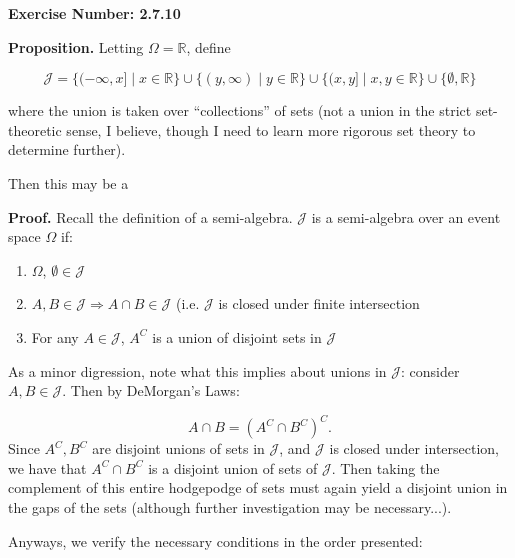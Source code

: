 \documentclass{article}
\begin{document}
\noindent \textbf{Exercise Number: 2.7.10}  %

\medskip 

\noindent \textbf{Proposition.} Letting $\Omega = \mathbb{R}$, define

\[\mathcal{J} = \Big\{(-\infty, x] \mid x \in \mathbb{R} \Big\} \cup \Big\{(y, \infty) \mid y \in \mathbb{R} \Big\} \cup \Big\{ (x,y] \mid x,y \in \mathbb{R} \Big\} \cup \Big\{\emptyset, \mathbb{R} \Big\}\]

where the union is taken over ``collections'' of sets (not a union in the strict set-theoretic
sense, I believe, though I need to learn more rigorous set theory to determine further). 

Then this may be a 

\bigskip

\noindent \textbf{Proof.} Recall the definition of a semi-algebra. $\mathcal{J}$ is a 
semi-algebra over an event space $\Omega$ if: 

\begin{enumerate}

\item $\Omega$, $\emptyset \in \mathcal{J}$

\item $A,B \in \mathcal{J} \Rightarrow A \cap B \in \mathcal{J}$ (i.e. $\mathcal{J}$ is closed under finite intersection 

\item For any $A \in \mathcal{J}$, $A^C$ is a union of disjoint sets in $\mathcal{J}$ 

\end{enumerate}

As a minor digression, note what this implies about unions in $\mathcal{J}$: consider $A,B \in \mathcal{J}$. Then by DeMorgan's Laws: 

\[A \cap B = (A^C \cap B^C)^C.\] Since $A^C, B^C$ are disjoint unions of sets in $\mathcal{J}$, 
and $\mathcal{J}$ is closed under intersection, we have that $A^C \cap B^C$ is a disjoint union
of sets of $\mathcal{J}$. Then taking the complement of this entire hodgepodge of sets must
again yield a disjoint union in the gaps of the sets (although further investigation may be necessary...).

\smallskip

\noindent Anyways, we verify the necessary conditions in the order presented:
\end{document}
